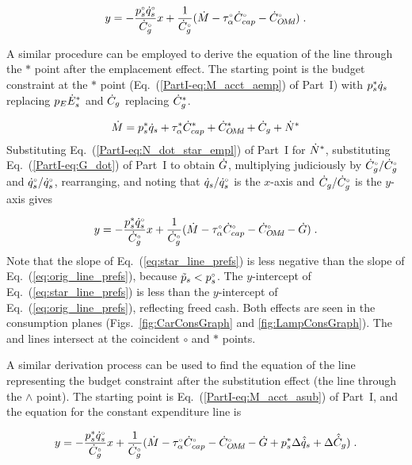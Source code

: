 \begin{equation} \label{eq:orig_line_prefs}
  y = - \frac{{}{p}^{\scriptscriptstyle \circ}_s {}{\dot{q}}^{\scriptscriptstyle \circ}_s}{{}{\dot{C}}^{\scriptscriptstyle \circ}_g} x
         + \frac{1}{{}{\dot{C}}^{\scriptscriptstyle \circ}_g} (\dot{M} - {}{\tau}^{\scriptscriptstyle \circ}_\alpha {}{\dot{C}}^{\scriptscriptstyle \circ}_{cap} - {}{\dot{C}}^{\scriptscriptstyle \circ}_{O\!M\!d}) \; .
\end{equation}

A similar procedure can be employed to derive the equation of the
\starstar{} line through the $*$ point
after the emplacement effect.
The starting point is the budget constraint at the $*$ point
(Eq.~(\ref{PartI-eq:M_acct_aemp}) of Part~I)
with 
${p}^*_s \dot{q}_s$ replacing $p_E {\dot{E}}^*_s$ and
$\dot{C}_g$ replacing ${\dot{C}}^*_g$.

\begin{equation}
  \dot{M} = {p}^*_s \dot{q}_s + {\tau}^*_\alpha {\dot{C}}^*_{cap} + {\dot{C}}^*_{O\!M\!d} + \dot{C}_g + {\dot{N}}^*
\end{equation}
%
Substituting Eq.~(\ref{PartI-eq:N_dot_star_empl}) of Part~I for ${\dot{N}}^*$,
substituting Eq.~(\ref{PartI-eq:G_dot}) of Part~I to obtain $\dot{G}$,
multiplying judiciously by ${}{\dot{C}}^{\scriptscriptstyle \circ}_g/{}{\dot{C}}^{\scriptscriptstyle \circ}_g$ and ${}{\dot{q}}^{\scriptscriptstyle \circ}_s/{}{\dot{q}}^{\scriptscriptstyle \circ}_s$, 
rearranging, and noting that 
$\dot{q}_s/{}{\dot{q}}^{\scriptscriptstyle \circ}_s$ is the $x$-axis and 
$\dot{C}_g/{}{\dot{C}}^{\scriptscriptstyle \circ}_g$ is the $y$-axis gives

\begin{equation} \label{eq:star_line_prefs}
  y = - \frac{{p}^*_s {}{\dot{q}}^{\scriptscriptstyle \circ}_s}{{}{\dot{C}}^{\scriptscriptstyle \circ}_g} x
         + \frac{1}{{}{\dot{C}}^{\scriptscriptstyle \circ}_g} (\dot{M} - {}{\tau}^{\scriptscriptstyle \circ}_\alpha {}{\dot{C}}^{\scriptscriptstyle \circ}_{cap} - {}{\dot{C}}^{\scriptscriptstyle \circ}_{O\!M\!d} - \dot{G}) \; .
\end{equation}
%
Note that the slope of Eq.~(\ref{eq:star_line_prefs}) is less negative
than the slope of Eq.~(\ref{eq:orig_line_prefs}), 
because $\tilde{p}_s < {}{p}^{\scriptscriptstyle \circ}_s$.
The $y$-intercept of Eq.~(\ref{eq:star_line_prefs}) is less than the 
$y$-intercept of Eq.~(\ref{eq:orig_line_prefs}),
reflecting freed cash.
Both effects are seen in
the consumption planes
(Figs.~\ref{fig:CarConsGraph} and \ref{fig:LampConsGraph}).
The \circcirc{} and \starstar{} lines intersect at the coincident $\circ$ and $*$ points.

A similar derivation process can be used to find the equation of 
the line representing the budget constraint
after the substitution effect (the \hathatline{} line through the $\wedge$ point).
The starting point is Eq.~(\ref{PartI-eq:M_acct_asub}) of Part~I, and 
the equation for the constant expenditure line is

\begin{equation} \label{eq:hat_line_prefs}
  y = - \frac{{p}^*_s {}{\dot{q}}^{\scriptscriptstyle \circ}_s}{{}{\dot{C}}^{\scriptscriptstyle \circ}_g} x
         + \frac{1}{{}{\dot{C}}^{\scriptscriptstyle \circ}_g} (\dot{M} - {}{\tau}^{\scriptscriptstyle \circ}_\alpha {}{\dot{C}}^{\scriptscriptstyle \circ}_{cap} - {}{\dot{C}}^{\scriptscriptstyle \circ}_{O\!M\!d} 
                                   - \dot{G} + {p}^*_s \Delta \hat{\dot{q}}_s + \Delta \hat{\dot{C}}_g) \; .
\end{equation}

